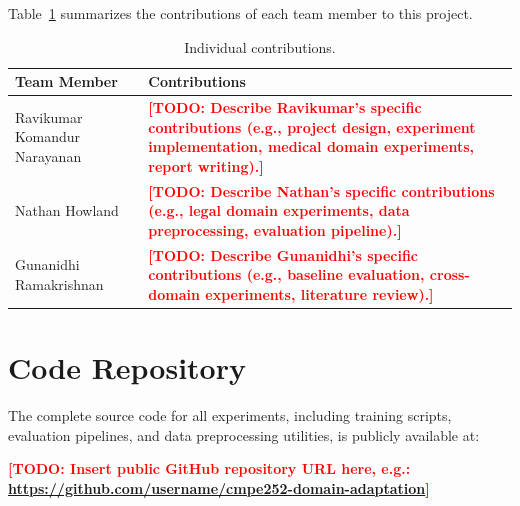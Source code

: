 \documentclass[12pt, letterpaper]{article}
\newcommand{\todo}[1]{\textcolor{red}{\textbf{[TODO: #1]}}}
\begin{document}
Table~\ref{tab:contributions} summarizes the contributions of each team member to this project.

\begin{table}[H]
\centering
\caption{Individual contributions.}
\label{tab:contributions}
\begin{tabular}{lp{10cm}}
\toprule
\textbf{Team Member} & \textbf{Contributions} \\
\midrule
Ravikumar Komandur Narayanan & \todo{Describe Ravikumar's specific contributions (e.g., project design, experiment implementation, medical domain experiments, report writing).} \\
\addlinespace
Nathan Howland & \todo{Describe Nathan's specific contributions (e.g., legal domain experiments, data preprocessing, evaluation pipeline).} \\
\addlinespace
Gunanidhi Ramakrishnan & \todo{Describe Gunanidhi's specific contributions (e.g., baseline evaluation, cross-domain experiments, literature review).} \\
\bottomrule
\end{tabular}
\end{table}

\section{Code Repository}
\label{sec:code-repo}

The complete source code for all experiments, including training scripts, evaluation pipelines, and data preprocessing utilities, is publicly available at:

\begin{center}
    \todo{Insert public GitHub repository URL here, e.g.:\\
    \url{https://github.com/username/cmpe252-domain-adaptation}}
\end{center}



\end{document}
